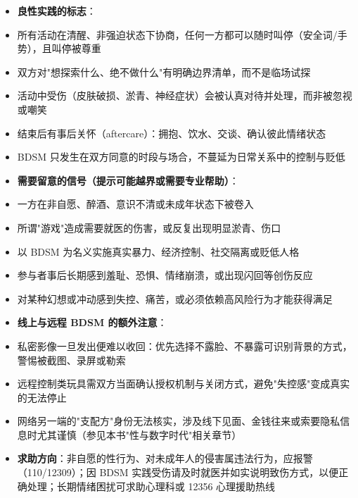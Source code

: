 \documentclass[12pt,UTF8]{ctexbook}
\begin{document}
\begin{itemize}
\item \textbf{良性实践的标志}：
\end{itemize}
  \begin{itemize}
  	\item 所有活动在清醒、非强迫状态下协商，任何一方都可以随时叫停（安全词/手势），且叫停被尊重
  	\item 双方对"想探索什么、绝不做什么"有明确边界清单，而不是临场试探
  	\item 活动中受伤（皮肤破损、淤青、神经症状）会被认真对待并处理，而非被忽视或嘲笑
  	\item 结束后有事后关怀（aftercare）：拥抱、饮水、交谈、确认彼此情绪状态
  	\item BDSM 只发生在双方同意的时段与场合，不蔓延为日常关系中的控制与贬低
  \end{itemize}
\begin{itemize}
\item \textbf{需要留意的信号（提示可能越界或需要专业帮助）}：
\end{itemize}
  \begin{itemize}
  	\item 一方在非自愿、醉酒、意识不清或未成年状态下被卷入
  	\item 所谓"游戏"造成需要就医的伤害，或反复出现明显淤青、伤口
  	\item 以 BDSM 为名义实施真实暴力、经济控制、社交隔离或贬低人格
  	\item 参与者事后长期感到羞耻、恐惧、情绪崩溃，或出现闪回等创伤反应
  	\item 对某种幻想或冲动感到失控、痛苦，或必须依赖高风险行为才能获得满足
  \end{itemize}
\begin{itemize}
\item \textbf{线上与远程 BDSM 的额外注意}：
\end{itemize}
  \begin{itemize}
  	\item 私密影像一旦发出便难以收回：优先选择不露脸、不暴露可识别背景的方式，警惕被截图、录屏或勒索
  	\item 远程控制类玩具需双方当面确认授权机制与关闭方式，避免"失控感"变成真实的无法停止
  	\item 网络另一端的"支配方"身份无法核实，涉及线下见面、金钱往来或索要隐私信息时尤其谨慎（参见本书"性与数字时代"相关章节）
  \end{itemize}
\begin{itemize}
\item \textbf{求助方向}：非自愿的性行为、对未成年人的侵害属违法行为，应报警（110/12309）；因 BDSM 实践受伤请及时就医并如实说明致伤方式，以便正确处理；长期情绪困扰可求助心理科或 12356 心理援助热线
\end{itemize}
\end{document}
